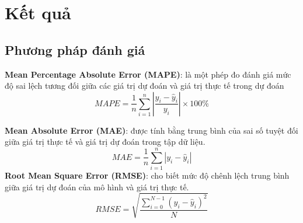 \documentclass[conference]{IEEEtran}
\begin{document}
\section{Kết quả}
\subsection{Phương pháp đánh giá}
\textbf{Mean Percentage Absolute Error (MAPE)}: là một phép đo đánh giá mức độ sai lệch tương đối giữa các giá trị dự đoán và giá trị thực tế trong dự đoán
\[
    MAPE = \frac{1}{n} \sum_{i=1}^{n} \left| \frac{y_i - \hat{y}_i}{y_i} \right| \times 100\%
\]

\textbf{Mean Absolute Error (MAE)}: được tính bằng trung bình của sai số tuyệt đối giữa giá trị thực tế và giá trị dự đoán trong tập dữ liệu.
\[
    MAE = \frac{1}{n}\sum_{i=1}^{n}\left|y_i-{\hat{y}}_i\right|
\]
\textbf{Root Mean Square Error (RMSE)}: cho biết mức độ chênh lệch trung bình giữa giá trị dự đoán của mô hình và giá trị thực tế.
\[
    RMSE = \sqrt{\frac{\sum_{i=0}^{N - 1} (y_i - \hat{y}_i)^2}{N}}
\]
\end{document}

